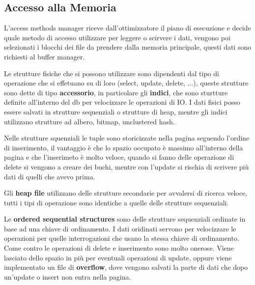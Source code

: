 \documentclass[12pt]{article}
\begin{document}
\subsection{Accesso alla Memoria}
L'access methods manager riceve dall'ottimizzatore il piano di esecuzione e decide quale metodo di accesso utilizzare per leggere o scirvere i dati, vengono poi selezionati i blocchi dei file da prendere dalla memoria principale, questi dati sono richiesti al buffer manager.

Le strutture fisiche che si possono utilizzare sono dipendenti dal tipo di operazione che si effetuano su di loro (select, update, delete, ...), queste strutture sono dette di tipo \textbf{accessorio}, in particolare gli \textbf{indici}, che sono sturtture definite all'interno del db per velocizzare le operazioni di IO. I dati fisici posso essere salvati in strutture sequenziali o strutture di heap, mentre gli indici utilizzano strutture ad albero, bitmap, unclustered hash.

Nelle strutture squenziali le tuple sono storicizzate nella pagina seguendo l'ordine di inserimento, il vantaggio \`e che lo spazio occupato \`e massimo all'interno della pagina e che l'inserimeto \`e molto veloce, quando si fanno delle operazione di delete si vengono a creare dei buchi, mentre con l'update si rischia di scrivere pi\`u dati di quelli che avevo prima.

Gli \textbf{heap file} utilizzano delle strutture secondarie per avvalersi di ricerca veloce, tutti i tipi di operazione sono identiche a quelle delle strutture sequenziali.

Le \textbf{ordered sequential structures} sono delle strutture sequenziali ordinate in base ad una chiave di ordinamento. I dati oridinati servono per velocizzare le operazioni per quelle interrogazioni che usano la stessa chiave di ordinamento. Come contro le operazioni di delete e inserimento sono molto onerose. Viene lasciato dello spazio in pi\`u per eventuali operazioni di update, oppure viene implementato un file di \textbf{overflow}, dove vengono salvati la parte di dati che dopo un'update o insert non entra nella pagina.
\end{document}
